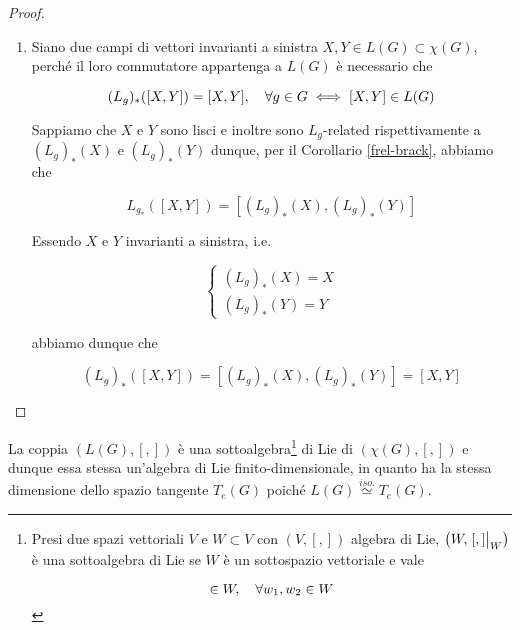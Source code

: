 \begin{proof}
\begin{enumerate}
		\item Siano due campi di vettori invarianti a sinistra $ X,Y \in L(G) \subset \chi(G) $, perché il loro commutatore appartenga a $ L(G) $ è necessario che
		
		\begin{equation}
			(L_{g})_{*}([X,Y]) = [X,Y] \qcomma \forall g \in G \iff [X,Y] \in L(G)
		\end{equation}
	
		Sappiamo che $ X $ e $ Y $ sono lisci e inoltre sono $ L_{g} $-related rispettivamente a $ (L_{g})_{*}(X) $ e $ (L_{g})_{*}(Y) $ dunque, per il Corollario \ref{frel-brack}, abbiamo che
		
		\begin{equation}
			L_{g_{*}}([X,Y]) = [(L_{g})_{*}(X), (L_{g})_{*}(Y)]
		\end{equation}
	
		Essendo $ X $ e $ Y $ invarianti a sinistra, i.e.
		
		\begin{equation}
			\begin{cases}
				(L_{g})_{*}(X) = X \\
				(L_{g})_{*}(Y) = Y
			\end{cases}
		\end{equation}
		
		abbiamo dunque che
		
		\begin{equation}
			(L_{g})_{*}([X,Y]) = [(L_{g})_{*}(X), (L_{g})_{*}(Y)] = [X,Y]
		\end{equation}		
	\end{enumerate}
\end{proof}

\begin{corollary}
	La coppia $ (L(G),[,]) $ è una sottoalgebra\footnote{%
		Presi due spazi vettoriali $ V $ e $ W \subset V $ con $ (V,[,]) $ algebra di Lie, $ \left( W, \eval{[,]}_{W} \right) $ è una sottoalgebra di Lie se $ W $ è un sottospazio vettoriale e vale
		
		\begin{equation*}
			[w_{1}, w_{2}] \in W \qcomma \forall w_{1},w_{2} \in W
		\end{equation*}%
	} di Lie di $ (\chi(G),[,]) $ e dunque essa stessa un'algebra di Lie finito-dimensionale, in quanto ha la stessa dimensione dello spazio tangente $ T_{e}(G) $ poiché $ L(G) \stackrel{iso.}{\simeq} T_{e}(G) $.
\end{corollary}

